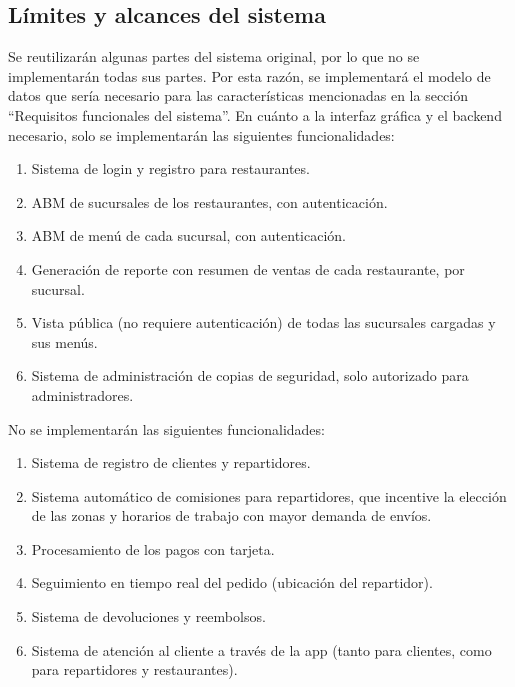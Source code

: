 \subsection{Límites y alcances del sistema}

Se reutilizarán algunas partes del sistema original, por lo que no se implementarán todas sus partes. Por esta razón, se implementará el modelo de datos que sería necesario para las características mencionadas en la sección ``Requisitos funcionales del sistema''. En cuánto a la interfaz gráfica y el backend necesario, solo se implementarán las siguientes funcionalidades:

\begin{enumerate}
    \item Sistema de login y registro para restaurantes.
    \item ABM de sucursales de los restaurantes, con autenticación.
    \item ABM de menú de cada sucursal, con autenticación.
    \item Generación de reporte con resumen de ventas de cada restaurante, por sucursal.
    \item Vista pública (no requiere autenticación) de todas las sucursales cargadas y sus menús.
    \item Sistema de administración de copias de seguridad, solo autorizado para administradores. \\
\end{enumerate}

No se implementarán las siguientes funcionalidades:

\begin{enumerate}
    \item Sistema de registro de clientes y repartidores.
    \item Sistema automático de comisiones para repartidores, que incentive la elección de las zonas y horarios de trabajo con mayor demanda de envíos.
    \item Procesamiento de los pagos con tarjeta.
    \item Seguimiento en tiempo real del pedido (ubicación del repartidor).
    \item Sistema de devoluciones y reembolsos.
    \item Sistema de atención al cliente a través de la app (tanto para clientes, como para repartidores y restaurantes).
\end{enumerate}
